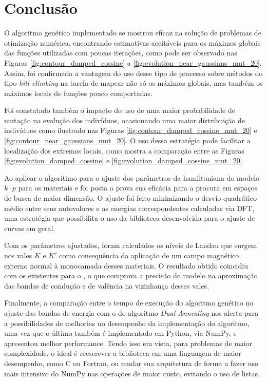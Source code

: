 \chapter{Conclusão}
\label{cap_conclusao}

O algoritmo genético implementado se mostrou eficaz na solução de problemas de
otimização numérica, encontrando estimativas aceitáveis para os máximos globais
das funções utilizadas com poucas iterações, como pode ser observado nas Figuras
\ref{fig:contour_damped_cossine} a \ref{fig:evolution_near_gaussians_mut_20}. Assim, foi
confirmada a vantagem do uso desse tipo de processo sobre métodos do tipo
\textit{hill climbing} na tarefa de mapear não só os máximos globais, mas também
os máximos locais de funções pouco comportadas.

Foi constatado também o impacto do uso de uma maior probabilidade de mutação na
evolução dos indivíduos, ocasionando uma maior distribuição de indivíduos como
ilustrado nas Figuras \ref{fig:contour_damped_cossine_mut_20} e
\ref{fig:contour_near_gaussians_mut_20}. O uso dessa estratégia pode facilitar a
localização dos extremos locais, como mostra a comparação entre as Figuras
\ref{fig:evolution_damped_cossine} e \ref{fig:evolution_damped_cossine_mut_20}.

Ao aplicar o algorítimo para o ajuste dos parâmetros da hamiltoniana do modelo 
$ k \cdot p $ para os materiais  e  foi posta a prova sua
eficácia para a procura em espaços de busca de maior dimensão. O ajuste foi
feito minimizando o desvio quadrático médio entre seus autovalores e as energias
correspondentes calculadas via DFT, uma estratégia que possibilita o uso da
biblioteca desenvolvida para o ajuste de curvas em geral.

Com os parâmetros ajustados, foram calculados os níveis de Landau que surgem nos
vales $K$ e $K'$ como consequência da aplicação de um campo magnético externo
normal à monocamada desses materiais. O resultado obtido coincidiu com os
existentes para o  \cite{dias2016tmdc}, o que comprova a precisão do
modelo na aproximação das bandas de condução e de valência na vizinhança desses
vales.

Finalmente, a comparação entre o tempo de execução do algoritmo genético no
ajuste das bandas de energia com o do algoritmo \textit{Dual Annealing} nos
alerta para a possibilidades de melhorias no desempenho da implementação do
algoritmo, uma vez que o último também é implementado em Python, via NumPy, e
apresentou melhor performance. Tendo isso em vista, para problemas de maior
complexidade, o ideal é reescrever a biblioteca em uma linguagem de maior
desempenho, como C ou Fortran, ou mudar sua arquitetura de forma a fazer uso
mais intensivo do NumPy nas operações de maior custo, evitando o uso de listas.

\nocite{ribeiro2013ga}